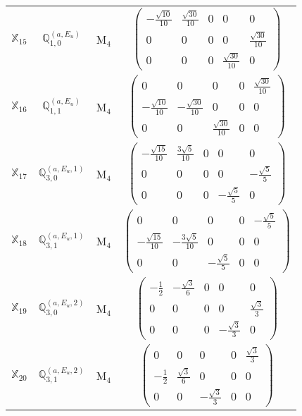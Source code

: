 \documentclass[fleqn,10pt,landscape]{article}
\begin{document}
\begin{itemize}
\begin{center}
\begin{longtable}{c|c|c|c}
$ \mathbb{X}_{15} $ & $\mathbb{Q}_{1,0}^{(a,E_{u})}$ & M$_{4}$ & $\begin{pmatrix} - \frac{\sqrt{10}}{10} & \frac{\sqrt{30}}{10} & 0 & 0 & 0 \\ 0 & 0 & 0 & 0 & \frac{\sqrt{30}}{10} \\ 0 & 0 & 0 & \frac{\sqrt{30}}{10} & 0 \end{pmatrix}$ \\
$ \mathbb{X}_{16} $ & $\mathbb{Q}_{1,1}^{(a,E_{u})}$ & M$_{4}$ & $\begin{pmatrix} 0 & 0 & 0 & 0 & \frac{\sqrt{30}}{10} \\ - \frac{\sqrt{10}}{10} & - \frac{\sqrt{30}}{10} & 0 & 0 & 0 \\ 0 & 0 & \frac{\sqrt{30}}{10} & 0 & 0 \end{pmatrix}$ \\
$ \mathbb{X}_{17} $ & $\mathbb{Q}_{3,0}^{(a,E_{u},1)}$ & M$_{4}$ & $\begin{pmatrix} - \frac{\sqrt{15}}{10} & \frac{3 \sqrt{5}}{10} & 0 & 0 & 0 \\ 0 & 0 & 0 & 0 & - \frac{\sqrt{5}}{5} \\ 0 & 0 & 0 & - \frac{\sqrt{5}}{5} & 0 \end{pmatrix}$ \\
$ \mathbb{X}_{18} $ & $\mathbb{Q}_{3,1}^{(a,E_{u},1)}$ & M$_{4}$ & $\begin{pmatrix} 0 & 0 & 0 & 0 & - \frac{\sqrt{5}}{5} \\ - \frac{\sqrt{15}}{10} & - \frac{3 \sqrt{5}}{10} & 0 & 0 & 0 \\ 0 & 0 & - \frac{\sqrt{5}}{5} & 0 & 0 \end{pmatrix}$ \\
$ \mathbb{X}_{19} $ & $\mathbb{Q}_{3,0}^{(a,E_{u},2)}$ & M$_{4}$ & $\begin{pmatrix} - \frac{1}{2} & - \frac{\sqrt{3}}{6} & 0 & 0 & 0 \\ 0 & 0 & 0 & 0 & \frac{\sqrt{3}}{3} \\ 0 & 0 & 0 & - \frac{\sqrt{3}}{3} & 0 \end{pmatrix}$ \\
$ \mathbb{X}_{20} $ & $\mathbb{Q}_{3,1}^{(a,E_{u},2)}$ & M$_{4}$ & $\begin{pmatrix} 0 & 0 & 0 & 0 & \frac{\sqrt{3}}{3} \\ - \frac{1}{2} & \frac{\sqrt{3}}{6} & 0 & 0 & 0 \\ 0 & 0 & - \frac{\sqrt{3}}{3} & 0 & 0 \end{pmatrix}$ \\

\end{longtable}
\end{center}
\end{itemize}
\end{document}
